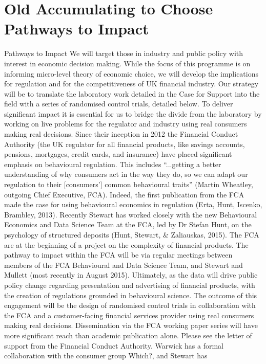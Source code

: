\section{Old Accumulating to Choose Pathways to Impact}

Pathways to Impact
We will target those in industry and public policy with interest in economic decision making.
While the focus of this programme is on informing micro-level theory of economic choice,
we will develop the implications for regulation and for the competitiveness of UK financial
industry. Our strategy will be to translate the laboratory work detailed in the Case for Support
into the field with a series of randomised control trials, detailed below. To deliver significant
impact it is essential for us to bridge the divide from the laboratory by working on live
problems for the regulator and industry using real consumers making real decisions.
Since their inception in 2012 the Financial Conduct Authority (the UK regulator for all
financial products, like savings accounts, pensions, mortgages, credit cards, and insurance)
have placed significant emphasis on behavioural regulation. This includes “...getting a better
understanding of why consumers act in the way they do, so we can adapt our regulation to
their [consumers’] common behavioural traits” (Martin Wheatley, outgoing Chief Executive,
FCA). Indeed, the first publication from the FCA made the case for using behavioural
economics in regulation (Erta, Hunt, Iscenko, Brambley, 2013). Recently Stewart has worked
closely with the new Behavioural Economics and Data Science Team at the FCA, led by Dr
Stefan Hunt, on the psychology of structured deposits (Hunt, Stewart, \& Zaliauskas, 2015).
The FCA are at the beginning of a project on the complexity of financial products. The
pathway to impact within the FCA will be via regular meetings between members of the FCA
Behavioural and Data Science Team, and Stewart and Mullett (most recently in August 2015).
Ultimately, as the data will drive public policy change regarding presentation and advertising
of financial products, with the creation of regulations grounded in behavioural science. The
outcome of this engagement will be the design of randomised control trials in collaboration
with the FCA and a customer-facing financial services provider using real consumers making
real decisions. Dissemination via the FCA working paper series will have more significant
reach than academic publication alone. Please see the letter of support from the Financial
Conduct Authority.
Warwick has a formal collaboration with the consumer group Which?, and Stewart has

